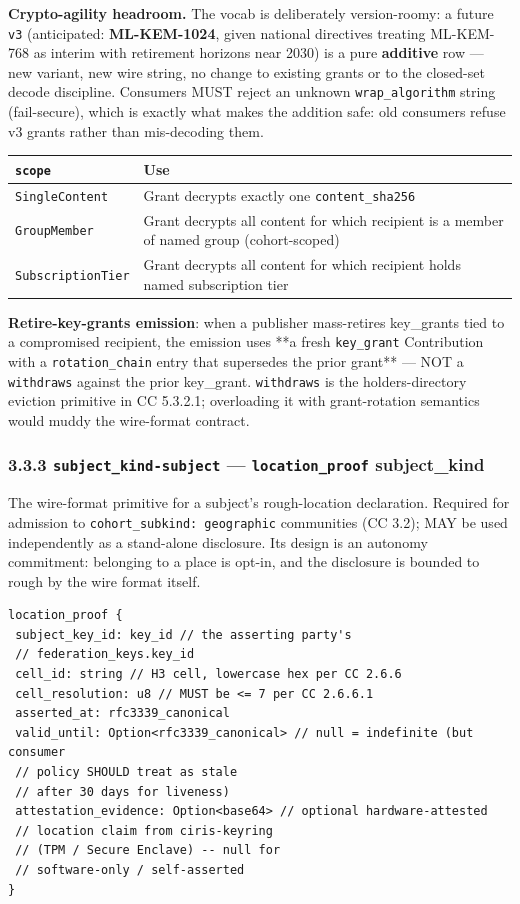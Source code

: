 \documentclass[11pt]{article}
\begin{document}
\textbf{Crypto-agility headroom.} The vocab is deliberately version-roomy: a future \texttt{v3} (anticipated: \textbf{ML-KEM-1024}, given national directives treating ML-KEM-768 as interim with retirement horizons near 2030) is a pure \textbf{additive} row — new variant, new wire string, no change to existing grants or to the closed-set decode discipline. Consumers MUST reject an unknown \texttt{wrap\_algorithm} string (fail-secure), which is exactly what makes the addition safe: old consumers refuse v3 grants rather than mis-decoding them.


{\footnotesize
\begin{longtable}{|p{8.0cm}|p{8.0cm}|}\hline
\textbf{\texttt{scope}} & \textbf{Use} \\ \hline\endhead
\texttt{SingleContent} & Grant decrypts exactly one \texttt{content\_sha256} \\ \hline
\texttt{GroupMember} & Grant decrypts all content for which recipient is a member of named group (cohort-scoped) \\ \hline
\texttt{SubscriptionTier} & Grant decrypts all content for which recipient holds named subscription tier \\ \hline
\end{longtable}}


\textbf{Retire-key-grants emission}: when a publisher mass-retires key\_grants tied to a compromised recipient, the emission uses **a fresh \texttt{key\_grant} Contribution with a \texttt{rotation\_chain} entry that supersedes the prior grant** — NOT a \texttt{withdraws} against the prior key\_grant. \texttt{withdraws} is the holders-directory eviction primitive in CC 5.3.2.1; overloading it with grant-rotation semantics would muddy the wire-format contract.


\subsubsection*{3.3.3 \texttt{subject\_kind-subject} — \texttt{location\_proof} subject\_kind}


The wire-format primitive for a subject's rough-location declaration. Required for admission to \texttt{cohort\_subkind: geographic} communities (CC 3.2); MAY be used independently as a stand-alone disclosure. Its design is an autonomy commitment: belonging to a place is opt-in, and the disclosure is bounded to rough by the wire format itself.


\begin{lstlisting}
location_proof {
 subject_key_id: key_id // the asserting party's
 // federation_keys.key_id
 cell_id: string // H3 cell, lowercase hex per CC 2.6.6
 cell_resolution: u8 // MUST be <= 7 per CC 2.6.6.1
 asserted_at: rfc3339_canonical
 valid_until: Option<rfc3339_canonical> // null = indefinite (but consumer
 // policy SHOULD treat as stale
 // after 30 days for liveness)
 attestation_evidence: Option<base64> // optional hardware-attested
 // location claim from ciris-keyring
 // (TPM / Secure Enclave) -- null for
 // software-only / self-asserted
}
\end{lstlisting}
\end{document}
